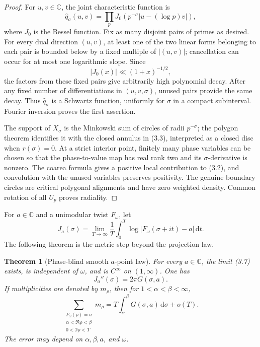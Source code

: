 \documentclass[11pt]{article}
\newtheorem{theorem}{Theorem}[section]
\theoremstyle{definition}
\theoremstyle{remark}
\newcommand{\dd}{\,\mathrm d}
\newcommand{\C}{\mathbb C}
\begin{document}
\begin{proof}
For $u,v\in\C$, the joint characteristic function is
\[
 \widehat q_\sigma(u,v)
 =\prod_pJ_0\!\left(p^{-\sigma}|u-(\log p)v|\right),
\tag{3.5}
\]
where $J_0$ is the Bessel function.  Fix as many disjoint pairs of primes as desired.
For every dual direction $(u,v)$, at least one of the two linear forms belonging to
each pair is bounded below by a fixed multiple of $|(u,v)|$; cancellation can occur
for at most one logarithmic slope.  Since
\[
 |J_0(x)|\ll(1+x)^{-1/2},
\tag{3.6}
\]
the factors from these fixed pairs give arbitrarily high polynomial decay.  After any
fixed number of differentiations in $(u,v,\sigma)$, unused pairs provide the same
decay.  Thus $\widehat q_\sigma$ is a Schwartz function, uniformly for $\sigma$ in a
compact subinterval.  Fourier inversion proves the first assertion.

The support of $X_\sigma$ is the Minkowski sum of circles of radii $p^{-\sigma}$;
the polygon theorem identifies it with the closed annulus in (3.3), interpreted as a
closed disc when $r(\sigma)=0$.  At a strict interior point, finitely many phase
variables can be chosen so that the phase-to-value
map has real rank two and its $\sigma$-derivative is nonzero.  The coarea formula gives
a positive local contribution to (3.2), and convolution with the unused variables
preserves positivity.  The genuine boundary circles are critical polygonal alignments
and have zero weighted density.  Common rotation of all $U_p$ proves radiality.
\end{proof}

For $a\in\C$ and a unimodular twist $F_\omega$, let
\[
 J_a(\sigma)=
 \lim_{T\to\infty}\frac1T\int_0^T
 \log|F_\omega(\sigma+it)-a|\dd t.
\tag{3.7}
\]
The following theorem is the metric step beyond the projection law.

\begin{theorem}[Phase-blind smooth $a$-point law]
\label{thm:smooth-a-law}
For every $a\in\C$, the limit (3.7) exists, is independent of $\omega$, and is
$C^\infty$ on $(1,\infty)$.  One has
\[
 \boxed{J_a''(\sigma)=2\pi G(\sigma,a).}
\tag{3.8}
\]
If multiplicities are denoted by $m_\rho$, then for
$1<\alpha<\beta<\infty$,
\[
 \boxed{
 \sum_{\substack{F_\omega(\rho)=a\\
                   \alpha<\Re\rho<\beta\\0<\Im\rho<T}}m_\rho
 =T\int_\alpha^\beta G(\sigma,a)\dd\sigma+o(T).
 }
\tag{3.9}
\]
The error may depend on $\alpha,\beta,a$, and $\omega$.
\end{theorem}
\end{document}
